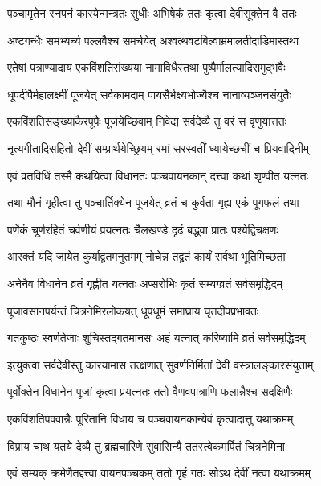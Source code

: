 \twolineshloka
{पञ्चामृतेन स्नपनं कारयेन्मन्त्रतः सुधीः}
{अभिषेकं ततः कृत्वा देवीसूक्तेन वै ततः}%


\twolineshloka
{अष्टगन्धैः समभ्यर्च्य पल्लवैश्च समर्चयेत्}
{अश्वत्थवटबिल्वाम्रमालतीदाडिमास्तथा}%


\twolineshloka
{एतेषां पत्राण्यादाय एकविंशतिसंख्यया}
{नामाविधैस्तथा पुष्पैर्मालत्यादिसमुद्भवैः}%


\twolineshloka
{धूपदीपैर्महालक्ष्मीं पूजयेत् सर्वकामदाम्}
{पायसैर्भक्ष्यभोज्यैश्च नानाव्यञ्जनसंयुतैः}%


\twolineshloka
{एकविंशतिसङ्ख्याकैरपूपैः पूजयेच्छिवाम्}
{निवेद्य सर्वदेव्यै तु वरं स वृणुयात्ततः}%


\twolineshloka
{नृत्यगीतादिसहितो देवीं सम्प्रार्थयेच्छ्रियम्}
{रमां सरस्वतीं ध्यायेच्छचीं च प्रियवादिनीम्}%


\twolineshloka
{एवं व्रतविधिं तस्मै कथयित्वा विधानतः}
{पञ्चवायनकान् दत्त्वा कथां शृण्वीत यत्नतः}%


\twolineshloka
{तथा मौनं गृहीत्वा तु पञ्चार्तिक्येन पूजयेत्}
{व्रतं च कुर्वता गृह्य एकं पूगफलं तथा}%


\twolineshloka
{पर्णेकं चूर्णरहितं चर्वणीयं प्रयत्नतः}
{चैलखण्डे दृढं बद्ध्वा प्रातः पश्येद्विचक्षणः}%


\twolineshloka
{आरक्तं यदि जायेत कुर्याद्व्रतमनुतमम्}
{नोचेन्न तद्व्रतं कार्यं सर्वथा भूतिमिच्छता}%


\twolineshloka
{अनेनैव विधानेन व्रतं गृह्णीत यत्नतः}
{अप्सरोभिः कृतं सम्यग्व्रतं सर्वसमृद्धिदम्}%


\twolineshloka
{पूजावसानपर्यन्तं चित्रनेमिरलोकयत्}
{धूपधूमं समाघ्राय घृतदीपप्रभावतः}%


\twolineshloka
{गतकुष्ठः स्वर्णतेजाः शुचिस्तद्गतमानसः}
{अहं यत्नात् करिष्यामि व्रतं सर्वसमृद्धिदम्}%


\twolineshloka
{इत्युक्त्वा सर्वदेवीस्तु कारयामास तत्क्षणात्}
{सुवर्णनिर्मितां देवीं वस्त्रालङ्कारसंयुताम्}%


\twolineshloka
{पूर्वोक्तेन विधानेन पूजां कृत्वा प्रयत्नतः}
{ततो वैणवपात्राणि फलान्नैश्च सदक्षिणैः}%


\twolineshloka
{एकविंशतिपक्वान्नैः पूरितानि विधाय च}
{पञ्चवायनकान्येवं कृत्वादात्तु यथाक्रमम्}%


\twolineshloka
{विप्राय चाथ यतये देव्यै तु ब्रह्मचारिणे}
{सुवासिन्यै ततस्त्वेकमर्पितं चित्रनेमिना}%


\twolineshloka
{एवं सम्यक् क्रमेणैतद्दत्त्वा वायनपञ्चकम्}
{ततो गृहं गतः सोऽथ देवीं नत्वा यथाक्रमम्}%


